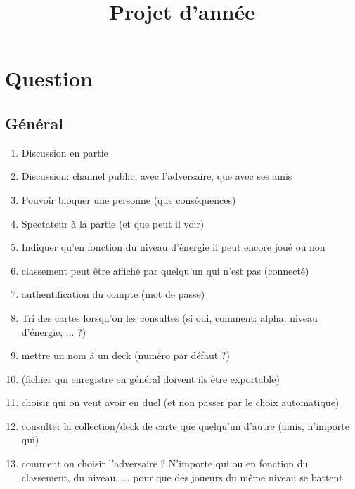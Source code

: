 \documentclass[11pt]{article}
\title{Projet d'année}
\begin{document}
\maketitle


\section{Question}
  \subsection{Général}
    \begin{enumerate}
    \item Discussion en partie
    \item Discussion: channel public, avec l'adversaire, que avec ses amis
    \item Pouvoir bloquer une personne (que conséquences)
    \item Spectateur à la partie (et que peut il voir)
    \item Indiquer qu'en fonction du niveau d'énergie il peut encore joué ou non
    \item classement peut être affiché par quelqu'un qui n'est pas (connecté)
    \item authentification du compte (mot de passe)
    \item Tri des cartes lorsqu'on les consultes (si oui, comment: alpha, niveau d'énergie, ... ?)
    \item mettre un nom à un deck (numéro par défaut ?)
    \item (fichier qui enregistre en général doivent ils être exportable)
    \item choisir qui on veut avoir en duel (et non passer par le choix automatique)
    \item consulter la collection/deck de carte que quelqu'un d'autre (amis, n'importe qui)
    \item comment on choisir l'adversaire ?  N'importe qui ou en fonction du classement, du niveau, ... pour que des joueurs du même niveau se battent
    \end{enumerate}
  
\end{document}
